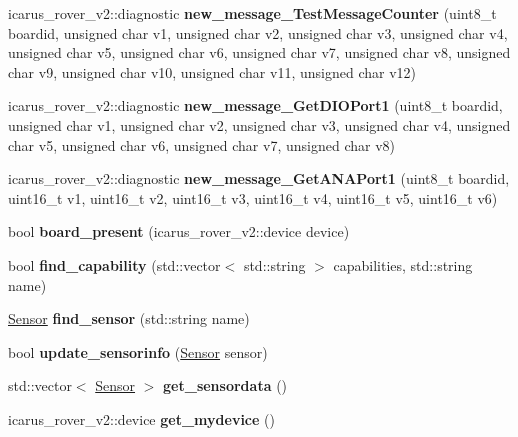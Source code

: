 \begin{DoxyCompactItemize}
icarus\+\_\+rover\+\_\+v2\+::diagnostic {\bfseries new\+\_\+message\+\_\+\+Test\+Message\+Counter} (uint8\+\_\+t boardid, unsigned char v1, unsigned char v2, unsigned char v3, unsigned char v4, unsigned char v5, unsigned char v6, unsigned char v7, unsigned char v8, unsigned char v9, unsigned char v10, unsigned char v11, unsigned char v12)
\item 
\mbox{\label{classBoardControllerNodeProcess_a191bf2d9871afe445ee8001a0e4408f0}} 
icarus\+\_\+rover\+\_\+v2\+::diagnostic {\bfseries new\+\_\+message\+\_\+\+Get\+D\+I\+O\+Port1} (uint8\+\_\+t boardid, unsigned char v1, unsigned char v2, unsigned char v3, unsigned char v4, unsigned char v5, unsigned char v6, unsigned char v7, unsigned char v8)
\item 
\mbox{\label{classBoardControllerNodeProcess_a939f42b24126a5eb31d7699bf28fff1c}} 
icarus\+\_\+rover\+\_\+v2\+::diagnostic {\bfseries new\+\_\+message\+\_\+\+Get\+A\+N\+A\+Port1} (uint8\+\_\+t boardid, uint16\+\_\+t v1, uint16\+\_\+t v2, uint16\+\_\+t v3, uint16\+\_\+t v4, uint16\+\_\+t v5, uint16\+\_\+t v6)
\item 
\mbox{\label{classBoardControllerNodeProcess_ac50ca11293c2d24d7b2463d021da9493}} 
bool {\bfseries board\+\_\+present} (icarus\+\_\+rover\+\_\+v2\+::device device)
\item 
\mbox{\label{classBoardControllerNodeProcess_a87eaa7764f4c4112cb7d72e77d47dbb4}} 
bool {\bfseries find\+\_\+capability} (std\+::vector$<$ std\+::string $>$ capabilities, std\+::string name)
\item 
\mbox{\label{classBoardControllerNodeProcess_a26bbb2f9f7984e18f71587782b432e7a}} 
\hyperlink{structSensor}{Sensor} {\bfseries find\+\_\+sensor} (std\+::string name)
\item 
\mbox{\label{classBoardControllerNodeProcess_afd339659029f0baf07129716ba404a49}} 
bool {\bfseries update\+\_\+sensorinfo} (\hyperlink{structSensor}{Sensor} sensor)
\item 
\mbox{\label{classBoardControllerNodeProcess_a5c98f2832aa0b3037cc06d4a0c90267d}} 
std\+::vector$<$ \hyperlink{structSensor}{Sensor} $>$ {\bfseries get\+\_\+sensordata} ()
\item 
\mbox{\label{classBoardControllerNodeProcess_a821a6101e2ee663b30e142807d4340a0}} 
icarus\+\_\+rover\+\_\+v2\+::device {\bfseries get\+\_\+mydevice} ()
\end{DoxyCompactItemize}

